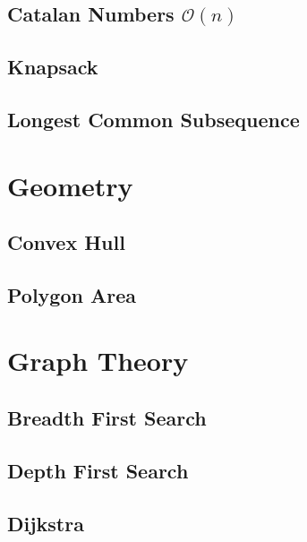 \documentclass[11pt]{article}
\begin{document}
\subsection{Catalan Numbers $\mathcal{O}(n)$}


\subsection{Knapsack}


\subsection{Longest Common Subsequence}



\section{Geometry}

\subsection{Convex Hull}


\subsection{Polygon Area}



\section{Graph Theory}

\subsection{Breadth First Search}


\subsection{Depth First Search}


\subsection{Dijkstra}

\end{document}
